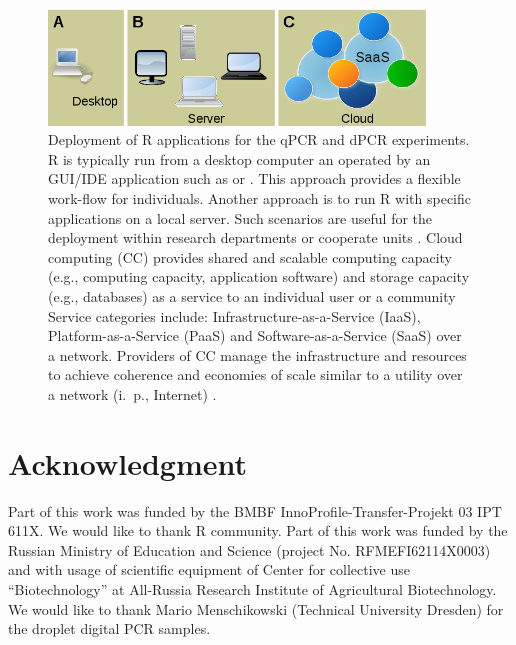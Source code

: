 \begin{figure}[htbp]
  \centering
  \includegraphics[clip=true, width=10cm]{figures/options.png}
  \caption{Deployment of R applications for the qPCR and dPCR experiments. 
 R is typically run from a desktop computer an operated by an 
GUI/IDE application such as  or . This approach 
provides a flexible work-flow for individuals.  Another approach is 
to run R with specific applications on a local server. Such scenarios are useful 
for the deployment within research departments or cooperate units \citep{R_web}. 
 Cloud computing (CC) provides shared and scalable computing 
capacity (e.g., computing capacity, application software) and storage capacity 
(e.g., databases) as a service to an individual user or a community Service 
categories include: Infrastructure-as-a-Service (IaaS), Platform-as-a-Service 
(PaaS) and Software-as-a-Service (SaaS) over a network. Providers of CC manage 
the infrastructure and resources to achieve coherence and economies of scale 
similar to a utility over a network (i.~p., Internet) \citep{R_cloud}.}
  \label{figure:options}
\end{figure} 

\section{Acknowledgment}

Part of this work was funded by the BMBF InnoProfile-Transfer-Projekt 03 IPT 
611X. We would like to thank R community. Part of this work was funded by the 
Russian Ministry of Education and Science (project No. RFMEFI62114X0003) and 
with usage of scientific equipment of Center for collective use 
``Biotechnology'' at All-Russia Research Institute of Agricultural 
Biotechnology. We would like to thank Mario Menschikowski (Technical University 
Dresden) for the droplet digital PCR samples.



\address{Stefan R\"odiger (corresponding author)\\
  Faculty of Natural Sciences\\
  Brandenburg University of Technology Cottbus--Senftenberg\\
  Senftenberg\\
  Germany}

